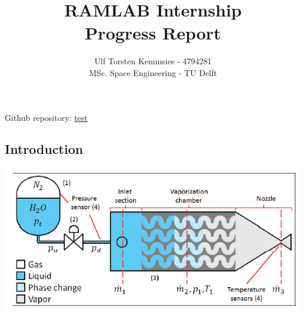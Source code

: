 \documentclass{homework}
\title{RAMLAB Internship \\ Progress Report}
\author{Ulf Torsten Kemmsies - 4794281  \\
MSc. Space Engineering - TU Delft}
\begin{document}
\maketitle

\begin{abstract}

\end{abstract}

\begin{center}
Github repository: \url{test}    
\end{center}

\begin{multicols}{2} %
\section{Introduction}

\begin{minipage}{\linewidth}
      \centering
      \includegraphics[width=\linewidth]{images/overview.png}
      \label{fig:model_overview}
  \end{minipage} 






\end{multicols}
\end{document}
